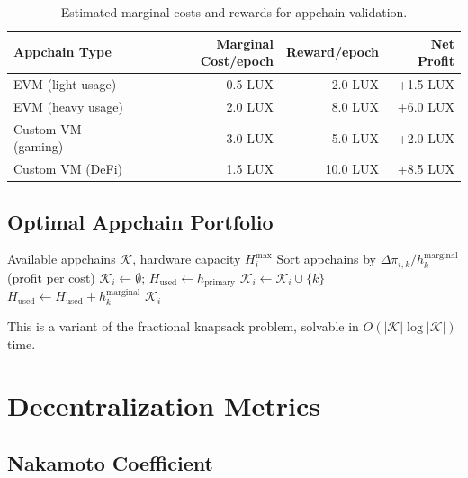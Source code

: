 \documentclass[11pt,a4paper]{article}
\begin{document}
\begin{table}[H]
\centering
\caption{Estimated marginal costs and rewards for appchain validation.}
\label{tab:appchain_economics}
\begin{tabular}{lrrr}
\toprule
\textbf{Appchain Type} & \textbf{Marginal Cost/epoch} & \textbf{Reward/epoch} & \textbf{Net Profit} \\
\midrule
EVM (light usage) & 0.5 LUX & 2.0 LUX & +1.5 LUX \\
EVM (heavy usage) & 2.0 LUX & 8.0 LUX & +6.0 LUX \\
Custom VM (gaming) & 3.0 LUX & 5.0 LUX & +2.0 LUX \\
Custom VM (DeFi) & 1.5 LUX & 10.0 LUX & +8.5 LUX \\
\bottomrule
\end{tabular}
\end{table}

\subsection{Optimal Appchain Portfolio}

\begin{algorithm}[H]
\caption{Optimal Appchain Selection for Validator $v_i$}
\label{alg:appchain_selection}
\begin{algorithmic}[1]
\Require Available appchains $\mathcal{K}$, hardware capacity $H_i^{\max}$
\State Sort appchains by $\Delta\pi_{i,k} / h_k^{\text{marginal}}$ (profit per cost)
\State $\mathcal{K}_i \gets \emptyset$; $H_{\text{used}} \gets h_{\text{primary}}$
        \State $\mathcal{K}_i \gets \mathcal{K}_i \cup \{k\}$
        \State $H_{\text{used}} \gets H_{\text{used}} + h_k^{\text{marginal}}$
    \EndIf
\EndFor
\State \Return $\mathcal{K}_i$
\end{algorithmic}
\end{algorithm}

This is a variant of the fractional knapsack problem, solvable in $O(|\mathcal{K}| \log |\mathcal{K}|)$ time.

\section{Decentralization Metrics}\label{sec:decentralization}

\subsection{Nakamoto Coefficient}
\end{document}
